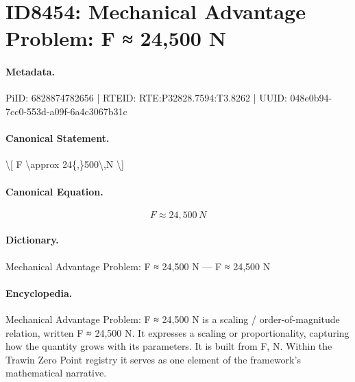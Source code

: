 \section*{ID8454: Mechanical Advantage Problem: F ≈ 24,500 N}
\paragraph{Metadata.}
PiID: 6828874782656 | RTEID: RTE:P32828.7594:T3.8262 | UUID: 048e0b94-7cc0-553d-a09f-6a4c3067b31c

\paragraph{Canonical Statement.}
\textbackslash{}[ F \textbackslash{}approx 24\{,\}500\textbackslash{},N \textbackslash{}]

\paragraph{Canonical Equation.}
\[
F \approx 24{,}500\,N
\]

\paragraph{Dictionary.}
Mechanical Advantage Problem: F ≈ 24,500 N — F ≈ 24,500 N

\paragraph{Encyclopedia.}
Mechanical Advantage Problem: F ≈ 24,500 N is a scaling / order-of-magnitude relation, written F ≈ 24,500 N. It expresses a scaling or proportionality, capturing how the quantity grows with its parameters. It is built from F, N. Within the Trawin Zero Point registry it serves as one element of the framework's mathematical narrative.
